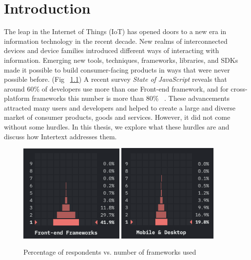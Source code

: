 
\chapter{Introduction}

The leap in the Internet of Things (IoT) has opened doors to a new era in information technology in the recent decade. New realms of interconnected devices and device families introduced different ways of interacting with information. Emerging new tools, techniques, frameworks, libraries, and SDKs made it possible to build consumer-facing products in ways that were never possible before. (Fig ~\ref{fig:num_of_frameworks_used}) A recent survey \textit{State of JavaScript} reveals that around 60\% of developers use more than one Front-end framework, and for cross-platform frameworks this number is more than 80\% ~\cite{StateOfJs2020}. These advancements attracted many users and developers and helped to create a large and diverse market of consumer products, goods and services. However, it did not come without some hurdles. In this thesis, we explore what these hurdles are and discuss how Intertext addresses them.

\begin{figure}
  \centering
  \includegraphics[width=5.2cm]{images/frontend_frameworks_2020.png}
  \qquad
  \includegraphics[width=5cm]{images/hybrid_frameworks_2020.png}
  \caption{Percentage of respondents vs. number of frameworks used}%
  \label{fig:num_of_frameworks_used}%
\end{figure}





